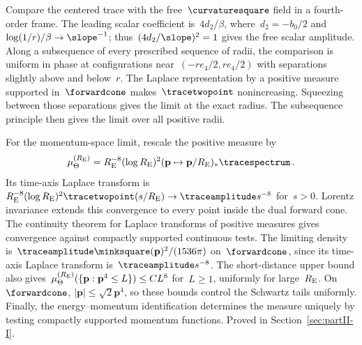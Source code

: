 Compare the centered trace with the free~$\curvaturesquare$ field in a fourth-order frame. The leading scalar coefficient is~$4d_2/\beta$, where~$d_2=-b_0/2$ and~$\log(1/r)/\beta\to\slope^{-1}$; thus~$(4d_2/\slope)^2=1$ gives the free scalar amplitude. Along a subsequence of every prescribed sequence of radii, the comparison is uniform in phase at configurations near~$(-re_4/2,re_4/2)$ with separations slightly above and below~$r$. The Laplace representation by a positive measure supported in~$\forwardcone$ makes~$\tracetwopoint$ nonincreasing. Squeezing between those separations gives the limit at the exact radius. The subsequence principle then gives the limit over all positive radii.

For the momentum-space limit, rescale the positive measure by
\begin{equation}\label{eq:P10-rescaled}
\mu_\Theta^{(R_{\rm E})}=R_{\rm E}^{-8}(\log R_{\rm E})^2(\mathbf p\mapsto\mathbf p/R_{\rm E})_*\tracespectrum\,.
\end{equation}
Its time-axis Laplace transform is~$R_{\rm E}^{-8}(\log R_{\rm E})^2\tracetwopoint(s/R_{\rm E})\to\traceamplitude s^{-8}$ for~$s>0$. Lorentz invariance extends this convergence to every point inside the dual forward cone. The continuity theorem for Laplace transforms of positive measures gives convergence against compactly supported continuous tests. The limiting density is~$\traceamplitude\minksquare(\mathbf p)^2/(1536\pi)$ on~$\forwardcone$, since its time-axis Laplace transform is~$\traceamplitude s^{-8}$. The short-distance upper bound also gives~$\mu_\Theta^{(R_{\rm E})}(\{\mathbf p:\mathbf p^4\le L\})\le CL^8$ for~$L\ge1$, uniformly for large~$R_{\rm E}$. On~$\forwardcone$, $|\mathbf p|\le\sqrt2\mathbf p^4$, so these bounds control the Schwartz tails uniformly. Finally, the energy--momentum identification determines the measure uniquely by testing compactly supported momentum functions. Proved in Section~\ref{sec:partII-I}.

